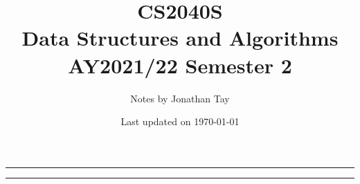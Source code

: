 \documentclass{article}
\title{\vspace{-1cm}\textbf{CS2040S \\[0.25em] Data Structures and Algorithms} \\[2em] \Large AY2021/22 Semester 2 \\[1em]}
\author{Notes by Jonathan Tay}
\date{Last updated on \today}
\newcommand{\pageline}[1]{\par\noindent\rule{\textwidth}{#1}}
\begin{document}
    \maketitle
    \pageline{1.5pt}
    \renewcommand{\baselinestretch}{0.75}\normalsize
    \tableofcontents
    \renewcommand{\baselinestretch}{1.15}\normalsize
    \pageline{1.5pt}

    \newpage
    \begin{multicols*}{2}
        
        
        
        
        
        
        
        
        
        
    \end{multicols*}
\end{document}
